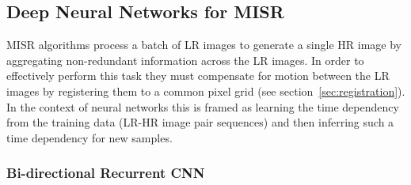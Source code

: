 \subsection{Deep Neural Networks for MISR}

MISR algorithms process a batch of LR images to generate a single HR image by aggregating non-redundant information across the LR images.
%
In order to effectively perform this task they must compensate for motion between the LR images by registering them to a common pixel grid (see section~\ref{sec:registration}).
%
In the context of neural networks this is framed as learning the time dependency from the training data (LR-HR image pair sequences) and then inferring such a time dependency for new samples.
%



\subsubsection{Bi-directional Recurrent CNN}




